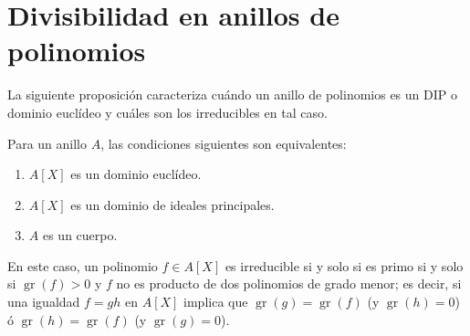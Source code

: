 \clearpage
\section{Divisibilidad en anillos de polinomios}

La siguiente proposición caracteriza cuándo un anillo de polinomios es un DIP o dominio euclídeo y cuáles son los irreducibles en tal caso.

\begin{proposition}{}{}
Para un anillo $A$, las condiciones siguientes son equivalentes:

\begin{enumerate}
\item $A[X]$ es un dominio euclídeo.
\item $A[X]$ es un dominio de ideales principales.
\item $A$ es un cuerpo.
\end{enumerate}

En este caso, un polinomio $f \in A[X]$ es irreducible si y solo si es primo si y solo si $\operatorname{gr}(f) > 0$ y $f$ no es producto de dos polinomios de grado menor; es decir, si una igualdad $f = gh$ en $A[X]$ implica que $\operatorname{gr}(g) = \operatorname{gr}(f)$ (y $\operatorname{gr}(h) = 0$) ó $\operatorname{gr}(h) = \operatorname{gr}(f)$ (y $\operatorname{gr}(g) = 0$).
\end{proposition}

